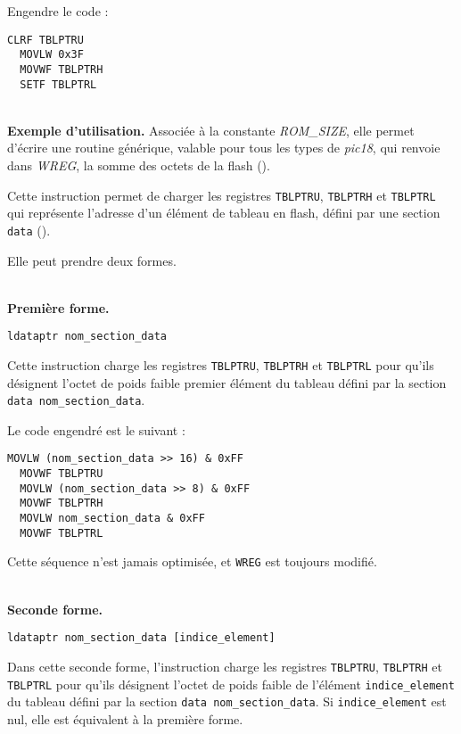 Engendre le code :
\begin{lstlisting}[language=assembleur]
  CLRF TBLPTRU
  MOVLW 0x3F
  MOVWF TBLPTRH
  SETF TBLPTRL
\end{lstlisting}


~\\
\textbf{Exemple d'utilisation.} Associée à la constante \emph{ROM\_SIZE}, elle permet d'écrire une routine générique, valable pour tous les types de \emph{pic18}, qui renvoie dans \emph{WREG}, la somme des octets de la flash ().



Cette instruction permet de charger les registres \texttt{TBLPTRU}, \texttt{TBLPTRH} et \texttt{TBLPTRL} qui représente l'adresse d'un élément de tableau en flash, défini par une section \texttt{data} ().

Elle peut prendre deux formes.

~\\
\textbf{Première forme.}

\begin{lstlisting}[language=piccolo]
  ldataptr nom_section_data
\end{lstlisting}

Cette instruction charge les registres \texttt{TBLPTRU}, \texttt{TBLPTRH} et \texttt{TBLPTRL} pour qu'ils désignent l'octet de poids faible premier élément du tableau défini par la section \texttt{data nom\_section\_data}.

Le code engendré est le suivant :
\begin{lstlisting}[language=assembleur]
  MOVLW (nom_section_data >> 16) & 0xFF
  MOVWF TBLPTRU
  MOVLW (nom_section_data >> 8) & 0xFF
  MOVWF TBLPTRH
  MOVLW nom_section_data & 0xFF
  MOVWF TBLPTRL
\end{lstlisting}

Cette séquence n'est jamais optimisée, et \texttt{WREG} est toujours modifié.

~\\
\textbf{Seconde forme.}

\begin{lstlisting}[language=piccolo]
  ldataptr nom_section_data [indice_element]
\end{lstlisting}

Dans cette seconde forme, l'instruction charge les registres \texttt{TBLPTRU}, \texttt{TBLPTRH} et \texttt{TBLPTRL} pour qu'ils désignent l'octet de poids faible de l'élément \texttt{indice\_element} du tableau défini par la section \texttt{data nom\_section\_data}. Si \texttt{indice\_element} est nul, elle est équivalent à la première forme.

